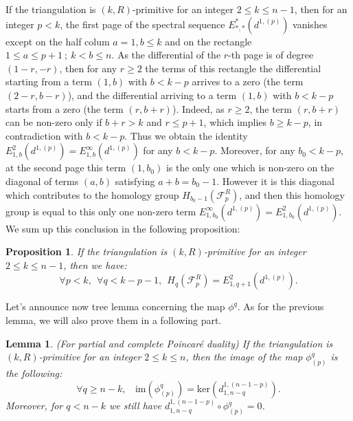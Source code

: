 \documentclass{article}
\newtheorem{lemma}{Lemma}
\newtheorem{proposition}{Proposition}
\begin{document}
If the triangulation is $(k,R)$-primitive for an integer $2\leq k \leq n-1$, then for an integer $p<k$, the first page of the spectral sequence $E_{*,*}^*(d^{1,(p)})$ vanishes except on the half colum $a=1, b \leq k$ and on the rectangle $1 \leq a \leq p+1 ~;~ k<b\leq n $. As the differential of the $r$-th page is of degree $(1-r,-r)$, then for any $r\geq 2$ the terms of this rectangle the differential starting from a term $(1,b)$ with $b<k-p$ arrives to a zero (the term $(2-r,b-r)$), and the differential arriving to a term $(1,b)$ with $b<k-p$ starts from a zero (the term $(r,b+r)$). Indeed, as $r\geq 2$, the term $(r,b+r)$ can be non-zero only if $b+r> k$ and $r\leq p+1$, which implies $b\geq k-p$, in contradiction with $b<k-p$. Thus we obtain the identity $E_{1,b}^2(d^{1,(p)})=E_{1,b}^{\infty}(d^{1,(p)})$ for any $b<k-p$. Moreover, for any $b_0<k-p$, at the second page this term $(1,b_0)$ is the only one which is non-zero on the diagonal of terms $(a,b)$ satisfying $a+b=b_0-1$. However it is this diagonal which contributes to the homology group $H_{b_0-1}(\mathcal{F}_p^R)$, and then this homology group is equal to this only one non-zero term $E_{1,b_0}^{\infty}(d^{1,(p)}) = E_{1,b_0}^2(d^{1,(p)})$. We sum up this conclusion in the following proposition:

\begin{proposition}
    If the triangulation is $(k,R)$-primitive for an integer $2 \leq k \leq n-1$, then we have:
    \begin{equation*}
        \forall p<k, ~~ \forall q <k-p-1, ~~ H_q(\mathcal{F}_p^R) = E^2_{1,q+1}(d^{1,(p)}) .
    \end{equation*}
    \label{10c}
\end{proposition}

Let's announce now tree lemma concerning the map $\phi^q$. As for the previous lemma, we will also prove them in a following part.

\begin{lemma}
    (For partial and complete Poincaré duality) If the triangulation is $(k,R)$-primitive for an integer $2 \leq k \leq n$, then the image of the map $\phi^q_{(p)}$ is the following:
    \begin{equation*}
        \forall q \geq n-k,~~~~\mathrm{im}(\phi^q_{(p)}) = \mathrm{ker}(d^{1,(n-1-p)}_{1,n-q}) .
    \end{equation*}
    \label{lebhb}
    Moreover, for $q<n-k$ we still have $d^{1,(n-1-p)}_{1,n-q}\circ\phi^q_{(p)} = 0$.
\end{lemma}
\end{document}
